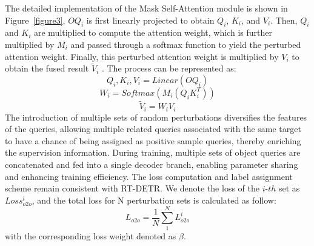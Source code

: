 \documentclass[10pt,twocolumn,letterpaper]{article}
\begin{document}
The detailed implementation of the Mask Self-Attention module is shown in Figure~\ref{figure3}, $OQ_{i}$ is first linearly projected to obtain $Q_{i}$, $K_{i}$, and $V_{i}$. Then, $Q_{i}$ and $K_{i}$ are multiplied to compute the attention weight, which is further multiplied by $M_{i}$ and passed through a softmax function to yield the perturbed attention weight. Finally, this perturbed attention weight is multiplied by ${V}_{i}$ to obtain the fused result $\tilde{V}_{i}$ . The process can be represented as:
\begin{equation}
    Q_{i}, K_{i}, V_{i} = Linear(OQ_{i})
\end{equation}
\begin{equation}
    W_{i} = Softmax(M_{i}(Q_{i}K^{T}_{i}))
\end{equation}
\begin{equation}
    \tilde{V}_{i} = W_{i}V_{i}
\end{equation}
The introduction of multiple sets of random perturbations diversifies the features of the queries, allowing multiple related queries associated with the same target to have a chance of being assigned as positive sample queries, thereby enriching the supervision information. During training, multiple sets of object queries are concatenated and fed into a single decoder branch, enabling parameter sharing and enhancing training efficiency. The loss computation and label assignment scheme remain consistent with RT-DETR. We denote the loss of the $i$-$th$ set as $Loss^{i}_{o2o}$, and the total loss for N perturbation sets is calculated as follow:
\begin{equation}
L_{o2o} = \frac{1}{N} \sum_{1}^{N}L^{i}_{o2o} 
\end{equation}
with the corresponding loss weight denoted as $\beta$.
\end{document}

